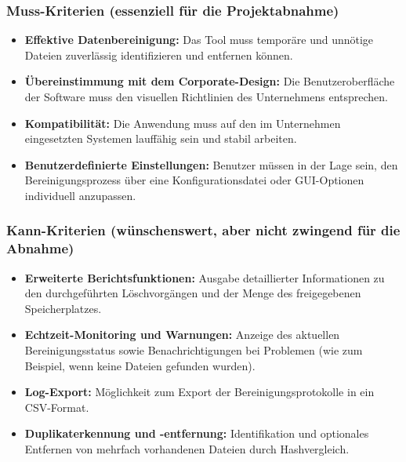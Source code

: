 
\subsubsection*{Muss-Kriterien (essenziell für die Projektabnahme)}

\begin{itemize}
  \item \textbf{Effektive Datenbereinigung:} Das Tool muss temporäre und unnötige Dateien zuverlässig identifizieren und entfernen können.

  \item \textbf{Übereinstimmung mit dem Corporate-Design:} Die Benutzeroberfläche der Software muss den visuellen Richtlinien des Unternehmens entsprechen.

  \item \textbf{Kompatibilität:} Die Anwendung muss auf den im Unternehmen eingesetzten Systemen lauffähig sein und stabil arbeiten.

  \item \textbf{Benutzerdefinierte Einstellungen:} Benutzer müssen in der Lage sein, den Bereinigungsprozess über eine Konfigurationsdatei oder GUI-Optionen individuell anzupassen.
\end{itemize}

\vspace{1em}
\subsubsection*{Kann-Kriterien (wünschenswert, aber nicht zwingend für die Abnahme)}

\begin{itemize}
  \item \textbf{Erweiterte Berichtsfunktionen:} Ausgabe detaillierter Informationen zu den durchgeführten Löschvorgängen und der Menge des freigegebenen Speicherplatzes.

  \item \textbf{Echtzeit-Monitoring und Warnungen:} Anzeige des aktuellen Bereinigungsstatus sowie Benachrichtigungen bei Problemen (wie zum Beispiel, wenn keine Dateien gefunden wurden).

  \item \textbf{Log-Export:} Möglichkeit zum Export der Bereinigungsprotokolle in ein CSV-Format.

  \item \textbf{Duplikaterkennung und -entfernung:} Identifikation und optionales Entfernen von mehrfach vorhandenen Dateien durch Hashvergleich.
\end{itemize}
